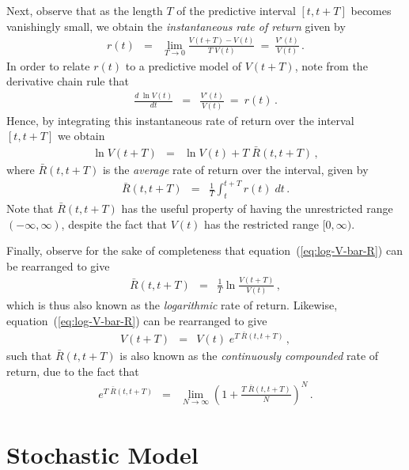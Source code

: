 \documentclass[a4paper]{book}
\begin{document}
Next, observe that as the length $T$ of the predictive interval 
$[t,t+T]$ becomes vanishingly small, we obtain the 
{\em instantaneous rate of return}
given by
\begin{eqnarray}
  r(t) & = & \lim_{T\rightarrow 0}\frac{V(t+T)-V(t)}{T\;V(t)}
 ~=~\frac{V'(t)}{V(t)}\,.
\label{eq:inst-rate-return}
\end{eqnarray}
In order to relate $r(t)$ to a predictive model of $V(t+T)$,
note from the derivative chain rule that 
\begin{eqnarray}
  \frac{d\;\ln V(t)}{dt} & = & \frac{V'(t)}{V(t)}~=~r(t)\,.
\end{eqnarray}
Hence, by integrating this instantaneous rate of return
over the interval $[t,t+T]$ we obtain
\begin{eqnarray}
  \ln V(t+T) & = & \ln V(t) + T\;\bar{R}(t,t+T)\,,
\label{eq:log-V-bar-R}
\end{eqnarray}
where $\bar{R}(t,t+T)$ is the {\em average} rate of return 
over the interval, given by
\begin{eqnarray}
  \bar{R}(t,t+T) & = & \frac{1}{T}\int_{t}^{t+T}r(t)\;dt\,.
\label{eq:bar-R-def}
\end{eqnarray}
Note that $\bar{R}(t,t+T)$ has 
the useful property of
having the unrestricted range $(-\infty,\infty)$, 
despite the fact that $V(t)$ has the restricted range $[0,\infty)$.

Finally, observe for the sake of completeness that
equation~(\ref{eq:log-V-bar-R}) can be rearranged to give
\begin{eqnarray}
  \bar{R}(t,t+T) & = &  \frac{1}{T}\ln\frac{V(t+T)}{V(t)}\,,
\end{eqnarray}
which is thus also known as the {\em logarithmic} rate of return.
Likewise, equation~(\ref{eq:log-V-bar-R}) can be rearranged to give
\begin{eqnarray}
  V(t+T) & = & V(t)\;e^{T\;\bar{R}(t,t+T)}\,,
\end{eqnarray}
such that $\bar{R}(t,t+T)$ 
is also known
as the {\em continuously compounded} rate of return, due to the fact that
\begin{eqnarray}
e^{T\;\bar{R}(t,t+T)} & = & 
\lim_{N\rightarrow\infty}\left(1+\frac{T\;\bar{R}(t,t+T)}{N}\right)^{N}\,.
\end{eqnarray}

\section{Stochastic Model}
\end{document}
